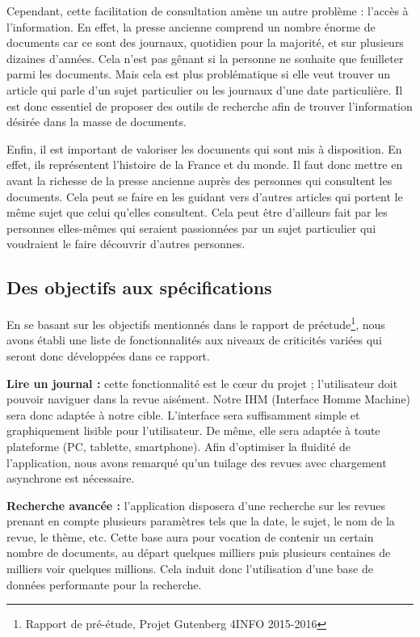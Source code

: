 		Cependant, cette facilitation de consultation amène un autre problème : l'accès à l'information. En effet, la presse ancienne comprend un nombre énorme de documents car ce sont des journaux, quotidien pour la majorité, et sur plusieurs dizaines d'années. Cela n'est pas gênant si la personne ne souhaite que feuilleter parmi les documents. Mais cela est plus problématique si elle veut trouver un article qui parle d'un sujet particulier ou les journaux d'une date particulière. Il est donc essentiel de proposer des outils de recherche afin de trouver l'information désirée dans la masse de documents.
			
		Enfin, il est important de valoriser les documents qui sont mis à disposition. En effet, ils représentent l'histoire de la France et du monde. Il faut donc mettre en avant la richesse de la presse ancienne auprès des personnes qui consultent les documents. Cela peut se faire en les guidant vers d'autres articles qui portent le même sujet que celui qu'elles consultent. Cela peut être d'ailleurs fait par les personnes elles-mêmes qui seraient passionnées par un sujet particulier qui voudraient le faire découvrir d'autres personnes. 
		
		\subsection{Des objectifs aux spécifications}
    \label{sec:objectifs}
    En se basant sur les objectifs mentionnés dans le rapport de préetude\footnote{Rapport de pré-étude, Projet Gutenberg 4INFO 2015-2016}, nous avons établi une liste de fonctionnalités aux niveaux de criticités variées qui seront donc développées dans ce rapport.


    \textbf{Lire un journal :} cette fonctionnalité est le cœur du projet ; l'utilisateur doit pouvoir naviguer dans la revue aisément.
    Notre IHM (Interface Homme Machine) sera donc adaptée à notre cible. L’interface sera suffisamment simple et graphiquement lisible pour l'utilisateur. De même, elle sera adaptée à toute plateforme (PC, tablette, smartphone). Afin d’optimiser la fluidité de l’application, nous avons remarqué
    qu’un tuilage des revues avec chargement asynchrone est nécessaire.


    \textbf{Recherche avancée :} l’application disposera d’une recherche sur les revues prenant en compte plusieurs paramètres
    tels que la date, le sujet, le nom de la revue, le thème, etc. Cette base aura pour vocation de contenir un certain nombre de documents, au
    départ quelques milliers puis plusieurs centaines de milliers voir quelques millions. Cela induit donc l’utilisation d’une base de données
    performante pour la recherche.

